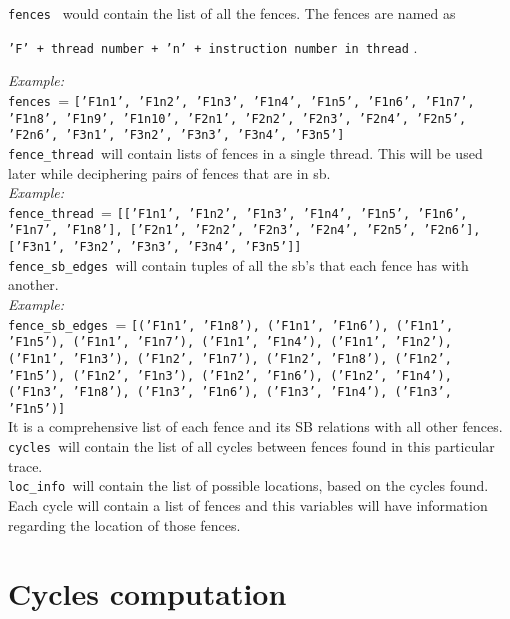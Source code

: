 \documentclass{article}
\newcommand{\var}[1]{\color{OliveGreen} \texttt{#1}\color{black}}
\newcommand{\varinfo}[1]{\scriptsize \texttt{#1} \normalsize}
\begin{document}
\var{fences } would contain the list of all the fences. The fences are named as \begin{center}
    \varinfo{'F' + thread number + 'n' + instruction number in thread}.
\end{center}
\textit{Example:}\\
\var{fences }= \varinfo{['F1n1', 'F1n2', 'F1n3', 'F1n4', 'F1n5', 'F1n6', 'F1n7', 'F1n8', 'F1n9', 'F1n10', 'F2n1', 'F2n2', 'F2n3', 'F2n4', 'F2n5', 'F2n6', 'F3n1', 'F3n2', 'F3n3', 'F3n4', 'F3n5']}\\

\var{fence\_thread }will contain lists of fences in a single thread. This will be used later while deciphering pairs of fences that are in sb.\\
\textit{Example:}\\
\var{fence\_thread }= \varinfo{[['F1n1', 'F1n2', 'F1n3', 'F1n4', 'F1n5', 'F1n6', 'F1n7', 'F1n8'], ['F2n1', 'F2n2', 'F2n3', 'F2n4', 'F2n5', 'F2n6'], ['F3n1', 'F3n2', 'F3n3', 'F3n4', 'F3n5']]}\\

\var{fence\_sb\_edges }will contain tuples of all the sb's that each fence has with another.\\
\textit{Example:}\\
\var{fence\_sb\_edges }= \varinfo{[('F1n1', 'F1n8'), ('F1n1', 'F1n6'), ('F1n1', 'F1n5'), ('F1n1', 'F1n7'), ('F1n1', 'F1n4'), ('F1n1', 'F1n2'), ('F1n1', 'F1n3'), ('F1n2', 'F1n7'), ('F1n2', 'F1n8'), ('F1n2', 'F1n5'), ('F1n2', 'F1n3'), ('F1n2', 'F1n6'), ('F1n2', 'F1n4'), ('F1n3', 'F1n8'), ('F1n3', 'F1n6'), ('F1n3', 'F1n4'), ('F1n3', 'F1n5')]}\\
It is a comprehensive list of each fence and its SB relations with all other fences.\\

\var{cycles }will contain the list of all cycles between fences found in this particular trace.\\

\var{loc\_info }will contain the list of possible locations, based on the cycles found. Each cycle will contain a list of fences and this variables will have information regarding the location of those fences.\\

\section{Cycles computation}
\par
\end{document}
